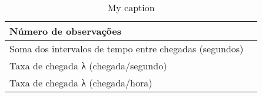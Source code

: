 \begin{table}[]
\centering
\caption{My caption}
\label{my-label}
\begin{tabular}{|l|l|}
\hline
Número de observações                                  &  \\ \hline
Soma dos intervalos de tempo entre chegadas (segundos) &  \\ \hline
Taxa de chegada λ (chegada/segundo)                    &  \\ \hline
Taxa de chegada λ (chegada/hora)                       &  \\ \hline
\end{tabular}
\end{table}
